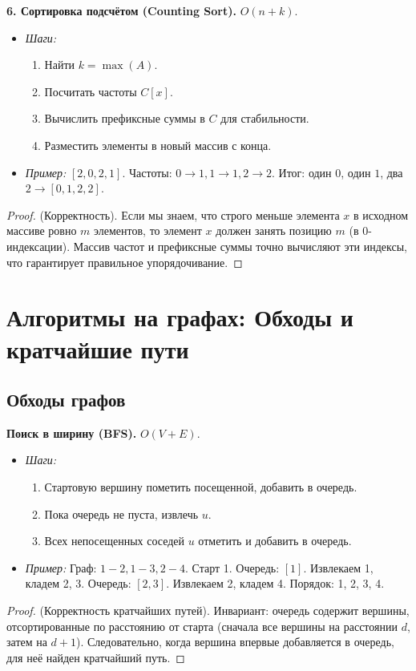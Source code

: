 \documentclass[12pt, a4paper]{article}
\begin{document}
\textbf{6. Сортировка подсчётом (Counting Sort).} $O(n + k)$.
\begin{itemize}
    \item \textit{Шаги:}
    \begin{enumerate}
        \item Найти $k = \max(A)$.
        \item Посчитать частоты $C[x]$.
        \item Вычислить префиксные суммы в $C$ для стабильности.
        \item Разместить элементы в новый массив с конца.
    \end{enumerate}
    \item \textit{Пример:} $[2, 0, 2, 1]$. Частоты: $0\to 1, 1\to 1, 2\to 2$. Итог: один $0$, один $1$, два $2 \to[0, 1, 2, 2]$.
\end{itemize}
\begin{proof}
(Корректность). Если мы знаем, что строго меньше элемента $x$ в исходном массиве ровно $m$ элементов, то элемент $x$ должен занять позицию $m$ (в 0-индексации). Массив частот и префиксные суммы точно вычисляют эти индексы, что гарантирует правильное упорядочивание.
\end{proof}

\section{Алгоритмы на графах: Обходы и кратчайшие пути}

\subsection{Обходы графов}

\textbf{Поиск в ширину (BFS).} $O(V + E)$.
\begin{itemize}
    \item \textit{Шаги:}
    \begin{enumerate}
        \item Стартовую вершину пометить посещенной, добавить в очередь.
        \item Пока очередь не пуста, извлечь $u$.
        \item Всех непосещенных соседей $u$ отметить и добавить в очередь.
    \end{enumerate}
    \item \textit{Пример:} Граф: $1-2, 1-3, 2-4$. Старт 1. Очередь: $[1]$. Извлекаем 1, кладем 2, 3. Очередь: $[2, 3]$. Извлекаем 2, кладем 4. Порядок: 1, 2, 3, 4.
\end{itemize}
\begin{proof}
(Корректность кратчайших путей). Инвариант: очередь содержит вершины, отсортированные по расстоянию от старта (сначала все вершины на расстоянии $d$, затем на $d+1$). Следовательно, когда вершина впервые добавляется в очередь, для неё найден кратчайший путь.
\end{proof}
\end{document}
